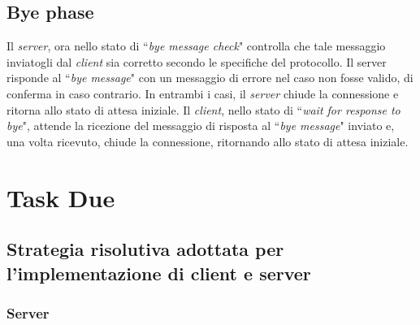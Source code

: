 \documentclass[a4paper, 12pt]{report}
\begin{document}
\section{Bye phase}

Il \textit{server}, ora nello stato di ``\textit{bye message check}" controlla che tale messaggio inviatogli dal \textit{client} sia corretto
secondo le specifiche del protocollo.\newline
Il server risponde al ``\textit{bye message}" con un messaggio di errore nel caso non fosse valido, di conferma in caso contrario.
In entrambi i casi, il \textit{server} chiude la connessione e ritorna allo stato di attesa iniziale.\newline
Il \textit{client}, nello stato di ``\textit{wait for response to bye}", attende la ricezione del messaggio di risposta al ``\textit{bye message}"
inviato e, una volta ricevuto, chiude la connessione, ritornando allo stato di attesa iniziale.

\chapter{Task Due}

\section{Strategia risolutiva adottata per l'implementazione di client e server}

\subsection{Server}
\end{document}
